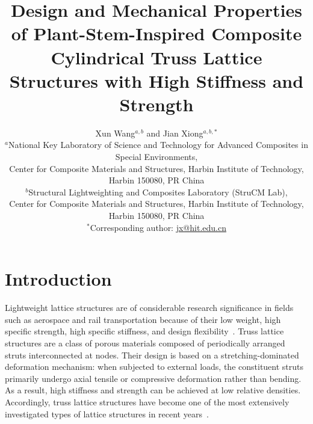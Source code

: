\documentclass[12pt,a4paper]{article}
\title{Design and Mechanical Properties of Plant-Stem-Inspired Composite Cylindrical Truss Lattice Structures with High Stiffness and Strength}
\author{
	Xun Wang$^{a,b}$ and Jian Xiong$^{a,b,*}$\\[0.5em]
	\small $^{a}$National Key Laboratory of Science and Technology for Advanced Composites in Special Environments,\\
	\small Center for Composite Materials and Structures, Harbin Institute of Technology, Harbin 150080, PR China\\
	\small $^{b}$Structural Lightweighting and Composites Laboratory (StruCM Lab),\\
	\small Center for Composite Materials and Structures, Harbin Institute of Technology, Harbin 150080, PR China\\[0.5em]
	\small $^{*}$Corresponding author: \href{mailto:jx@hit.edu.cn}{jx@hit.edu.cn}
}
\date{}
\numberwithin{equation}{section}
\begin{document}
	
	\maketitle
	
	\section{Introduction}
	
	Lightweight lattice structures are of considerable research significance in fields such as aerospace and rail transportation because of their low weight, high specific strength, high specific stiffness, and design flexibility~\cite{Ref1,Ref2,Ref3,Ref4,Ref5,Ref6,Ref7,Ref8,Ref9,Ref10}. Truss lattice structures are a class of porous materials composed of periodically arranged struts interconnected at nodes. Their design is based on a stretching-dominated deformation mechanism: when subjected to external loads, the constituent struts primarily undergo axial tensile or compressive deformation rather than bending. As a result, high stiffness and strength can be achieved at low relative densities. Accordingly, truss lattice structures have become one of the most extensively investigated types of lattice structures in recent years~\cite{Ref11}.
	
\end{document}

